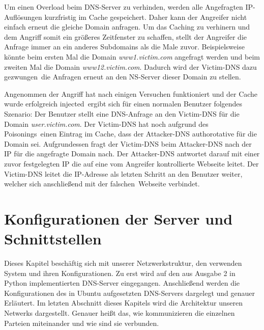 \documentclass[10pt,a4paper]{article}
\begin{document}
Um einen Overload beim DNS-Server zu verhinden, werden alle Angefragten IP-Auflösungen kurzfristig im Cache gespeichert. Daher kann der Angreifer nicht einfach erneut die gleiche Domain anfragen. Um das Caching zu verhinern und dem Angriff somit ein größeres Zeitfenster zu schaffen, stellt der Angreifer die Anfrage immer an ein anderes Subdomains als die Male zuvor. Beispielsweise könnte beim ersten Mal die Domain \emph{www1.victim.com} angefragt werden und beim zweiten Mal die Domain \emph{www12.victim.com}. Dadurch wird der Victim-DNS dazu \glqq gezwungen\grqq\ die Anfragen erneut an den NS-Server dieser Domain zu stellen.

Angenommen der Angriff hat nach einigen Versuchen funktioniert und der Cache wurde erfolgreich \glqq injected\grqq\ ergibt sich für einen normalen Benutzer folgendes Szenario: Der Benutzer stellt eine DNS-Anfrage an den Victim-DNS für die Domain \emph{user.victim.com}. Der Victim-DNS hat noch aufgrund des \glqq Poisonings\grqq\ einen Eintrag im Cache, dass der Attacker-DNS authorotative für die Domain sei. Aufgrundessen fragt der Victim-DNS beim Attacker-DNS nach der IP für die angefragte Domain nach. Der Attacker-DNS antwortet darauf mit einer zuvor festgelegten IP die auf eine vom Angreifer kontrollierte Webseite leitet. Der Victim-DNS leitet die IP-Adresse als letzten Schritt an den Benutzer weiter, welcher sich anschließend mit der \glqq falschen\grqq\ Webseite verbindet.

\section{Konfigurationen der Server und Schnittstellen}
Dieses Kapitel beschäftig sich mit unserer Netzwerkstruktur, den verwenden System und ihren Konfigurationen. Zu erst wird auf den aus Ausgabe 2 in Python implementierten DNS-Server eingegangen. Anschließend werden die Konfigurationen des in Ubuntu aufgesetzten DNS-Servers dargelegt und genauer Erläutert. Im letzten Abschnitt dieses Kapitels wird die Architektur unseren Netwerks dargestellt. Genauer heißt das, wie kommunizieren die einzelnen Parteien miteinander und wie sind sie verbunden.
\end{document}
